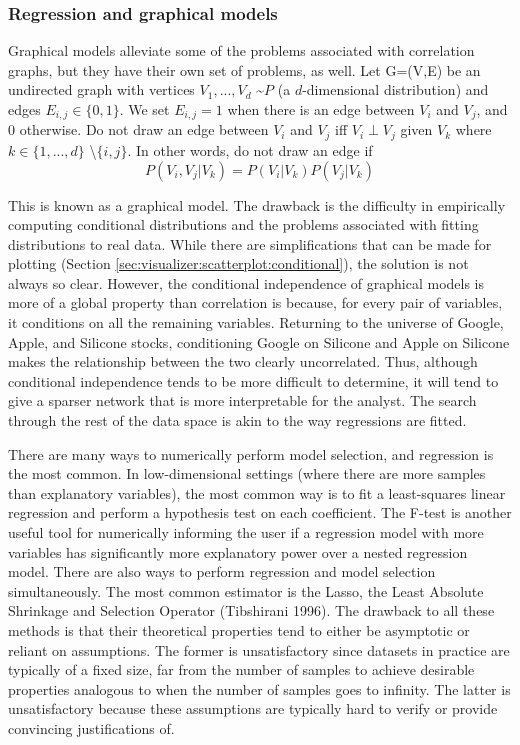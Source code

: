 \subsubsection{Regression and graphical models}

Graphical models alleviate some of the problems associated with correlation graphs, but they have their own set of problems, as well. Let G=(V,E) be an undirected graph with vertices $V_1,...,V_d$ \textasciitilde $P$ (a $d$-dimensional distribution) and edges $E_{i,j}\in\{0,1\}$. We set $E_{i,j}=1$ when there is an edge between $V_i$ and $V_j$, and 0 otherwise. Do not draw an edge between $V_i$ and $V_j$ iff $V_i \perp V_j$ given $V_k$ where $k\in\{1,...,d\}$ \textbackslash $\{i,j\}$. In other words, do not draw an edge if
$$P(V_i,V_j|V_k)=P(V_i|V_k)P(V_j|V_k)$$

This is known as a graphical model. The drawback is the difficulty in empirically computing conditional distributions and the problems associated with fitting distributions to real data. While there are simplifications that can be made for plotting (Section \ref{sec:visualizer:scatterplot:conditional}), the solution is not always so clear. However, the conditional independence of graphical models is more of a global property than correlation is because, for every pair of variables, it conditions on all the remaining variables. Returning to the universe of Google, Apple, and Silicone stocks, conditioning Google on Silicone and Apple on Silicone makes the relationship between the two clearly uncorrelated. Thus, although conditional independence tends to be more difficult to determine, it will tend to give a sparser network that is more interpretable for the analyst. The search through the rest of the data space is akin to the way regressions are fitted.

There are many ways to numerically perform model selection, and regression is the most common. In low-dimensional settings (where there are more samples than explanatory variables), the most common way is to fit a least-squares linear regression and perform a hypothesis test on each coefficient. The F-test is another useful tool for numerically informing the user if a regression model with more variables has significantly more explanatory power over a nested regression model. There are also ways to perform regression and model selection simultaneously. The most common estimator is the Lasso, the Least Absolute Shrinkage and Selection Operator (Tibshirani 1996). The drawback to all these methods is that their theoretical properties tend to either be asymptotic or reliant on assumptions. The former is unsatisfactory since datasets in practice are typically of a fixed size, far from the number of samples to achieve desirable properties analogous to when the number of samples goes to infinity. The latter is unsatisfactory because these assumptions are typically hard to verify or provide convincing justifications of.

